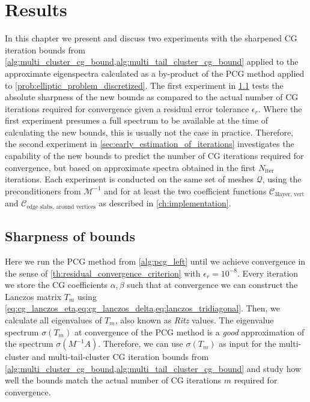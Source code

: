\chapter{Results}\label{ch:results}
In this chapter we present and discuss two experiments with the sharpened CG iteration bounds from \cref{alg:multi_cluster_cg_bound,alg:multi_tail_cluster_cg_bound} applied to the approximate eigenspectra calculated as a by-product of the PCG method applied to \cref{prob:elliptic_problem_discretized}. The first experiment in \cref{sec:sharpness_of_bounds} tests the absolute sharpness of the new bounds as compared to the actual number of CG iterations required for convergence given a residual error tolerance $\epsilon_r$. Where the first experiment presumes a full spectrum to be available at the time of calculating the new bounds, this is usually not the case in practice. Therefore, the second experiment in \cref{sec:early_estimation_of_iterations} investigates the capability of the new bounds to predict the number of CG iterations required for convergence, but based on approximate spectra obtained in the first $N_{\text{iter}}$ iterations. Each experiment is conducted on the same set of meshes $\mathcal{Q}$, using the preconditioners from $\mathcal{M}^{-1}$ and for at least the two coefficient functions $\mathcal{C}_{\text{3layer, vert}}$ and $\mathcal{C}_{\text{edge slabs, around vertices}}$ as described in \cref{ch:implementation}. 

\section{Sharpness of bounds}\label{sec:sharpness_of_bounds}
Here we run the PCG method from \cref{alg:pcg_left} until we achieve convergence in the sense of \cref{th:residual_convergence_criterion} with $\epsilon_r=10^{-8}$. Every iteration we store the CG coefficients $\alpha,\beta$ such that at convergence we can construct the Lanczos matrix $T_m$ using \cref{eq:cg_lanczos_eta,eq:cg_lanczos_delta,eq:lanczos_tridiagonal}. Then, we calculate all eigenvalues of $T_m$, also known as \textit{Ritz} values. The eigenvalue spectrum $\sigma(T_m)$ at convergence of the PCG method is a \textit{good} approximation of the spectrum $\sigma(M^{-1}A)$. Therefore, we can use $\sigma(T_m)$ as input for the multi-cluster and multi-tail-cluster CG iteration bounds from \cref{alg:multi_cluster_cg_bound,alg:multi_tail_cluster_cg_bound} and study how well the bounds match the actual number of CG iterations $m$ required for convergence. 

